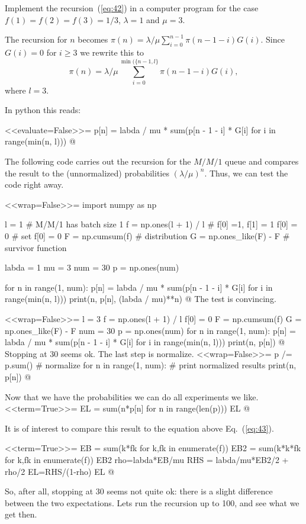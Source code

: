 \begin{question}
  Implement the recursion~(\ref{eq:42}) in a computer program for the
  case $f(1)=f(2)=f(3)=1/3$, $\lambda =1$ and $\mu = 3$.
  \begin{solution}
The recursion for $n$ becomes $\pi(n) = \lambda/\mu \sum_{i=0}^{n-1} \pi(n-1-i)G(i)$. Since $G(i) =0$ for $i\geq 3$ we rewrite this to 
\begin{equation*}
  \pi(n) = \lambda/\mu \sum_{i=0}^{\min(\{n-1,l\}} \pi(n-1-i)G(i),
\end{equation*}
where $l=3$. 

In python this reads:

<<evaluate=False>>=
p[n] = labda / mu * sum(p[n - 1 - i] * G[i] for i in range(min(n, l)))
@

The following code carries out the recursion for the $M/M/1$ queue and compares the result to the (unnormalized) probabilities $(\lambda/\mu)^n$. Thus, we can test the code right away. 

<<wrap=False>>=
import numpy as np

l = 1 # M/M/1 has batch size 1
f = np.ones(l + 1) / l # f[0] =1, f[1] = 1 
f[0] = 0 # set f[0] = 0
F = np.cumsum(f) # distribution 
G = np.ones_like(F) - F # survivor function

labda = 1
mu = 3
num = 30
p = np.ones(num)

for n in range(1, num):
    p[n] = labda / mu * sum(p[n - 1 - i] * G[i] for i in range(min(n, l)))
    print(n, p[n], (labda / mu)**n)
@
The test is convincing.

<<wrap=False>>=
l = 3
f = np.ones(l + 1) / l
f[0] = 0
F = np.cumsum(f)
G = np.ones_like(F) - F
num = 30
p = np.ones(num)
for n in range(1, num):
    p[n] = labda / mu * sum(p[n - 1 - i] * G[i] for i in range(min(n, l)))
    print(n, p[n])
@
Stopping at 30 seems ok. The last step is normalize.
<<wrap=False>>=
p /= p.sum()  # normalize
for n in range(1, num):  # print normalized results
    print(n, p[n])
@

Now that we have the probabilities we can do all experiments we like. 
<<term=True>>=
EL = sum(n*p[n] for n in range(len(p)))
EL 
@

It is of interest to compare this result to the equation above
Eq.~(\ref{eq:43}).


<<term=True>>=
EB = sum(k*fk for k,fk in enumerate(f))
EB2 = sum(k*k*fk for k,fk in enumerate(f))
EB2
rho=labda*EB/mu
RHS = labda/mu*EB2/2 + rho/2
EL=RHS/(1-rho)
EL
@

So, after all, stopping at 30 seems not quite ok: there is a slight
difference between the two expectations. Lets run the recursion up to
100, and see what we get then.


\end{solution}
\end{question}
